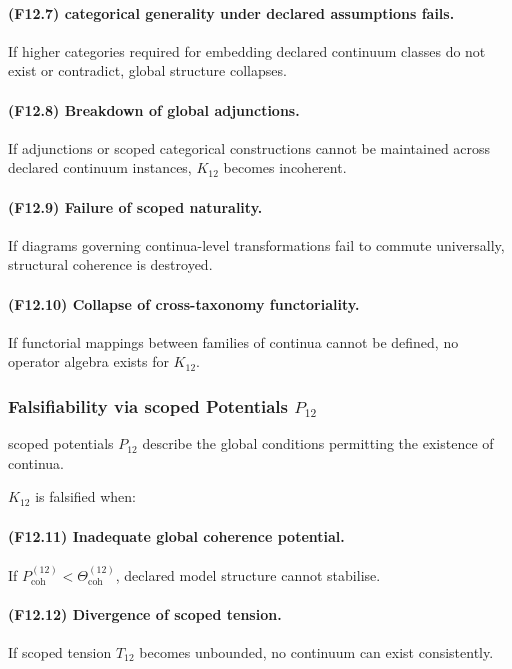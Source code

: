 \paragraph{(F12.7) categorical generality under declared assumptions fails.}
If higher categories required for embedding declared continuum classes do not exist or
contradict, global structure collapses.

\paragraph{(F12.8) Breakdown of global adjunctions.}
If adjunctions or scoped categorical constructions cannot be
maintained across declared continuum instances, $K_{12}$ becomes incoherent.

\paragraph{(F12.9) Failure of scoped naturality.}
If diagrams governing continua-level transformations fail to commute
universally, structural coherence is destroyed.

\paragraph{(F12.10) Collapse of cross-taxonomy functoriality.}
If functorial mappings between families of continua cannot be defined,
no operator algebra exists for $K_{12}$.



\subsubsection{Falsifiability via scoped Potentials $P_{12}$}

scoped potentials $P_{12}$ describe the global conditions permitting
the existence of continua.

$K_{12}$ is falsified when:

\paragraph{(F12.11) Inadequate global coherence potential.}
If $P_{\mathrm{coh}}^{(12)} < \Theta_{\mathrm{coh}}^{(12)}$,
declared model structure cannot stabilise.

\paragraph{(F12.12) Divergence of scoped tension.}
If scoped tension $T_{12}$ becomes unbounded,
no continuum can exist consistently.

